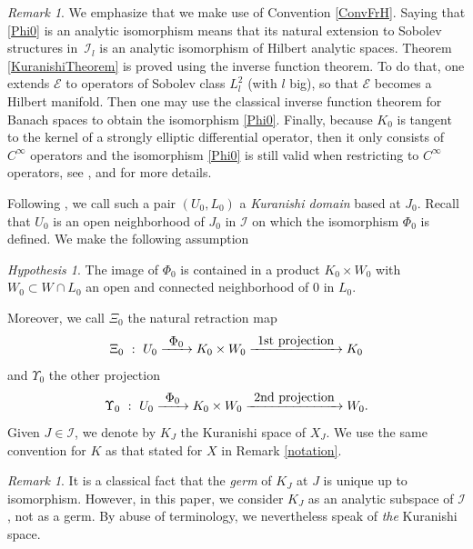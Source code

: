 \documentclass[10pt]{amsart}
\let\mathcal\mathscr
\def\To#1{\mathchoice{\xrightarrow{\textstyle\kern4pt#1\kern3pt}}{\stackrel{#1}{\longrightarrow}}{}{}}
\theoremstyle{plain}
\theoremstyle{definition}
\theoremstyle{remark}
\newtheorem{remark}[theorem]{Remark}
\newtheorem{hypothesis}[theorem]{Hypothesis}
\numberwithin{equation}{section}
\newcommand{\cI}{\mathcal{I}}
\begin{document}
\begin{remark}
\label{Sobolev}
We emphasize that we make use of Convention \ref{ConvFrH}. Saying that \eqref{Phi0} is an analytic isomorphism means that its natural extension to Sobolev structures in~$\cI_l$ is an analytic isomorphism of Hilbert analytic spaces.
Theorem \ref{KuranishiTheorem} is proved using the inverse function theorem. To do that, one extends $\mathcal E$ to operators of Sobolev class $L^2_l$ (with $l$ big), so that $\mathcal E$ becomes a Hilbert manifold. Then one may use the classical inverse function theorem for Banach spaces to obtain the isomorphism \eqref{Phi0}. Finally, because $K_0$ is tangent to the kernel of a strongly elliptic differential operator, then it only consists of $C^\infty$ operators and the isomorphism \eqref{Phi0} is still valid when restricting to $C^\infty$ operators, see \cite{Douady}, \cite{Kur1} and \cite{Ku3} for more details.
\end{remark}

Following \cite{circle}, we call such a pair $(U_0,L_0)$ a \emph{Kuranishi domain} based at $J_0$. Recall that $U_0$ is an open neighborhood of $J_0$ in $\cI$ on which the isomorphism $\Phi_0$ is defined. We make the following assumption
\begin{hypothesis}
\label{squarehyp}
The image of $\Phi_0$ is contained in a product $K_0\times W_0$ with $W_0\subset W\cap L_0$ an open and connected neighborhood of $0$ in $L_0$.
\end{hypothesis}
Moreover, we call $\Xi_0$ the natural retraction map
\begin{equation}
\label{Xi0}
\Xi_0\ :\ U_0\To{\Phi_0} K_0\times W_0 \To{\textup{1st projection}}K_0
\end{equation}
and $\Upsilon_0$ the other projection
\begin{equation}
\label{Up0}
\Upsilon_0\ :\ U_0\To{\Phi_0} K_0\times W_0 \To{\textup{2nd projection}}W_0.
\end{equation}
Given $J\in\cI$, we denote by $K_J$ the Kuranishi space of $X_J$. We use the same convention for $K$ as that stated for $X$ in Remark \ref{notation}.

\begin{remark}
\label{Kuniqueness}
It is a classical fact that the \emph{germ} of $K_J$ at $J$ is unique up to isomorphism. However, in this paper, we consider $K_J$ as an analytic subspace of $\cI$, not as a germ. By abuse of terminology, we nevertheless speak of \emph{the} Kuranishi space.
\end{remark}
\end{document}
